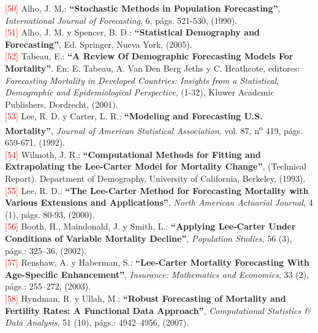 \noindent \textcolor{red}{[50]} Alho, J. M.: \textbf{``Stochastic Methods in Population Forecasting''}, \textit{International Journal of Forecasting}, 6, págs. 521-530, (1990).\\

\noindent \textcolor{red}{[51]} Alho, J. M. y Spencer, B. D.: \textbf{``Statistical Demography and Forecasting''}, Ed. Springer, Nueva York, (2005).\\

\noindent \textcolor{red}{[52]} Tabeau, E.: \textbf{``A Review Of Demographic Forecasting Models For Mortality''}. En: E. Tabeau, A. Van Den Berg Jeths y C. Heathcote, editores: \textit{Forecasting Mortality in Developed Countries: Insights from a Statistical, Demographic and Epidemiological Perspective}, (1-32), Kluwer Academic Publishers, Dordrecht, (2001).\\

\noindent \textcolor{red}{[53]} Lee, R. D. y Carter, L. R.: \textbf{``Modeling and Forecasting U.S. Mortality''}, \textit{Journal of American Statistical Association}, vol. 87, n\textsuperscript{o} 419, págs. 659-671, (1992).\\

\noindent \textcolor{red}{[54]} Wilmoth, J. R.:  \textbf{``Computational Methods for Fitting and Extrapolating the Lee-Carter Model for Mortality Change''}, (Technical Report). Department of Demography, University of California, Berkeley, (1993).\\

\noindent \textcolor{red}{[55]} Lee, R. D.: \textbf{``The Lee-Carter Method for Forecasting Mortality with Various Extensions and Applications''}, \textit{North American Actuarial Journal}, 4 (1), págs. 80-93, (2000).\\

\noindent \textcolor{red}{[56]} Booth, H., Maindonald, J. y Smith, L.: \textbf{``Applying Lee-Carter Under Conditions of Variable Mortality Decline''}, \textit{Population Studies}, 56 (3), págs.: 325–36, (2002).\\

\noindent \textcolor{red}{[57]} Renshaw, A. y Haberman, S.: \textbf{``Lee-Carter Mortality Forecasting With Age-Specific Enhancement''}, \textit{Insurance: Mathematics and Economics}, 33 (2), págs.: 255–272, (2003).\\

\noindent \textcolor{red}{[58]} Hyndman, R. y Ullah, M.: \textbf{``Robust Forecasting of Mortality and Fertility Rates: A Functional Data Approach''}, \textit{Computational Statistics \& Data Analysis}, 51 (10), págs.: 4942–4956, (2007).\\

